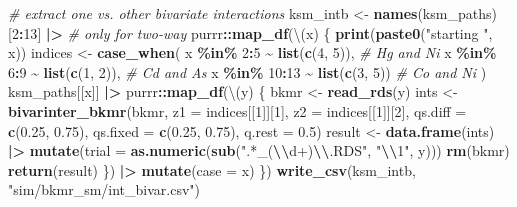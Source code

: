 \documentclass[12pt, twoside]{amherstthesis}
\newenvironment{Shaded}{\begin{snugshade}}{\end{snugshade}}
\newcommand{\AttributeTok}[1]{\textcolor[rgb]{0.13,0.29,0.53}{#1}}
\newcommand{\CommentTok}[1]{\textcolor[rgb]{0.56,0.35,0.01}{\textit{#1}}}
\newcommand{\DecValTok}[1]{\textcolor[rgb]{0.00,0.00,0.81}{#1}}
\newcommand{\FloatTok}[1]{\textcolor[rgb]{0.00,0.00,0.81}{#1}}
\newcommand{\FunctionTok}[1]{\textcolor[rgb]{0.13,0.29,0.53}{\textbf{#1}}}
\newcommand{\NormalTok}[1]{#1}
\newcommand{\OtherTok}[1]{\textcolor[rgb]{0.56,0.35,0.01}{#1}}
\newcommand{\SpecialCharTok}[1]{\textcolor[rgb]{0.81,0.36,0.00}{\textbf{#1}}}
\newcommand{\StringTok}[1]{\textcolor[rgb]{0.31,0.60,0.02}{#1}}
\begin{document}
\begin{Shaded}
\begin{Highlighting}[]
\CommentTok{\# extract one vs. other bivariate interactions}
\NormalTok{ksm\_intb }\OtherTok{\textless{}{-}} \FunctionTok{names}\NormalTok{(ksm\_paths)[}\DecValTok{2}\SpecialCharTok{:}\DecValTok{13}\NormalTok{] }\SpecialCharTok{|\textgreater{}} \CommentTok{\# only for two{-}way}
\NormalTok{  purrr}\SpecialCharTok{::}\FunctionTok{map\_df}\NormalTok{(\textbackslash{}(x) \{}
    \FunctionTok{print}\NormalTok{(}\FunctionTok{paste0}\NormalTok{(}\StringTok{"starting "}\NormalTok{, x))}
\NormalTok{    indices }\OtherTok{\textless{}{-}} \FunctionTok{case\_when}\NormalTok{(}
\NormalTok{      x }\SpecialCharTok{\%in\%} \DecValTok{2}\SpecialCharTok{:}\DecValTok{5} \SpecialCharTok{\textasciitilde{}} \FunctionTok{list}\NormalTok{(}\FunctionTok{c}\NormalTok{(}\DecValTok{4}\NormalTok{, }\DecValTok{5}\NormalTok{)), }\CommentTok{\# Hg and Ni}
\NormalTok{      x }\SpecialCharTok{\%in\%} \DecValTok{6}\SpecialCharTok{:}\DecValTok{9} \SpecialCharTok{\textasciitilde{}} \FunctionTok{list}\NormalTok{(}\FunctionTok{c}\NormalTok{(}\DecValTok{1}\NormalTok{, }\DecValTok{2}\NormalTok{)), }\CommentTok{\# Cd and As}
\NormalTok{      x }\SpecialCharTok{\%in\%} \DecValTok{10}\SpecialCharTok{:}\DecValTok{13} \SpecialCharTok{\textasciitilde{}} \FunctionTok{list}\NormalTok{(}\FunctionTok{c}\NormalTok{(}\DecValTok{3}\NormalTok{, }\DecValTok{5}\NormalTok{)) }\CommentTok{\# Co and Ni}
\NormalTok{    )}
\NormalTok{    ksm\_paths[[x]] }\SpecialCharTok{|\textgreater{}} 
\NormalTok{      purrr}\SpecialCharTok{::}\FunctionTok{map\_df}\NormalTok{(\textbackslash{}(y) \{}
\NormalTok{        bkmr }\OtherTok{\textless{}{-}} \FunctionTok{read\_rds}\NormalTok{(y)}
\NormalTok{        ints }\OtherTok{\textless{}{-}} \FunctionTok{bivarinter\_bkmr}\NormalTok{(bkmr, }
                                \AttributeTok{z1 =}\NormalTok{ indices[[}\DecValTok{1}\NormalTok{]][}\DecValTok{1}\NormalTok{], }
                                \AttributeTok{z2 =}\NormalTok{ indices[[}\DecValTok{1}\NormalTok{]][}\DecValTok{2}\NormalTok{], }
                                \AttributeTok{qs.diff =} \FunctionTok{c}\NormalTok{(}\FloatTok{0.25}\NormalTok{, }\FloatTok{0.75}\NormalTok{), }
                                \AttributeTok{qs.fixed =} \FunctionTok{c}\NormalTok{(}\FloatTok{0.25}\NormalTok{, }\FloatTok{0.75}\NormalTok{),}
                                \AttributeTok{q.rest =} \FloatTok{0.5}\NormalTok{)}
\NormalTok{        result }\OtherTok{\textless{}{-}} \FunctionTok{data.frame}\NormalTok{(ints) }\SpecialCharTok{|\textgreater{}} 
          \FunctionTok{mutate}\NormalTok{(}\AttributeTok{trial =} \FunctionTok{as.numeric}\NormalTok{(}\FunctionTok{sub}\NormalTok{(}\StringTok{".*\_(}\SpecialCharTok{\textbackslash{}\textbackslash{}}\StringTok{d+)}\SpecialCharTok{\textbackslash{}\textbackslash{}}\StringTok{.RDS"}\NormalTok{, }\StringTok{"}\SpecialCharTok{\textbackslash{}\textbackslash{}}\StringTok{1"}\NormalTok{, y)))}
        \FunctionTok{rm}\NormalTok{(bkmr)}
        \FunctionTok{return}\NormalTok{(result)}
\NormalTok{      \}) }\SpecialCharTok{|\textgreater{}} 
      \FunctionTok{mutate}\NormalTok{(}\AttributeTok{case =}\NormalTok{ x)}
\NormalTok{  \})}
\FunctionTok{write\_csv}\NormalTok{(ksm\_intb, }\StringTok{"sim/bkmr\_sm/int\_bivar.csv"}\NormalTok{)}


\end{Highlighting}
\end{Shaded}
\end{document}
